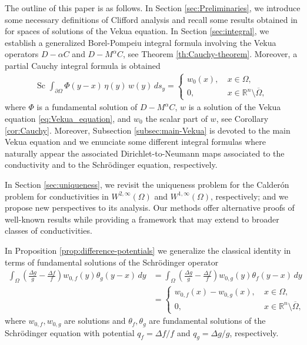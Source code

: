 \documentclass[12pt]{article}
\def\R{\mathbb{R}}
\begin{document}
The outline of this paper is as follows. In Section \ref{sec:Preliminaries}, we introduce some necessary definitions of Clifford analysis and recall some results obtained in \cite{Delgado2023} for spaces of solutions of the Vekua equation.
In Section \ref{sec:integral}, we establish a generalized Borel-Pompeiu integral formula involving the Vekua operators $D-\alpha C$ and $D-M^{\alpha}C$, see Theorem \ref{th:Cauchy-theorem}. Moreover, a partial Cauchy integral formula is obtained
\begin{align}\label{eq:scalar-Cauchy}
  \text{Sc }\int_{\partial\Omega} \Phi(y-x)\, \eta(y) \, w(y) \,ds_{y}=\left\{
   \begin{array}{ll}
      w_0(x), \ & x\in \Omega,\\
      0,           & x\in \R^n\setminus \overline{\Omega},
   \end{array}
\right.
\end{align}
where $\Phi$ is a fundamental solution of $D-M^{\alpha}C$, $w$ is a solution of the Vekua equation \eqref{eq:Vekua_equation}, and $w_0$ the scalar part of $w$, see Corollary \ref{cor:Cauchy}. Moreover, Subsection \ref{subsec:main-Vekua} is devoted to the main Vekua equation and we enunciate some different integral formulas where naturally appear the associated Dirichlet-to-Neumann maps associated to the conductivity and to the Schr\"{o}dinger equation, respectively.


In Section \ref{sec:uniqueness}, we revisit the uniqueness problem for the Calderón problem for conductivities in $W^{2,\infty}(\Omega)$ and $W^{1,\infty}(\Omega)$, respectively; and we propose new perspectives to its analysis. Our methods offer alternative proofs of well-known results while providing a framework that may extend to broader classes of conductivities. 

In Proposition \ref{prop:difference-potentials} we generalize the classical identity in terms of fundamental solutions of the Schr\"{o}dinger operator
\begin{align*}
\int_{\Omega} \left(\frac{\Delta g}{g}-\frac{\Delta f}{f}\right) w_{0,f}(y)\theta_g(y-x)\, dy&=\int_{\Omega} \left(\frac{\Delta g}{g}-\frac{\Delta f}{f}\right) w_{0,g}(y)\theta_f(y-x)\, dy \\
&=\left\{
   \begin{array}{ll}
      w_{0,f}(x)-w_{0,g}(x), \ & x\in \Omega,\\
      0,           & x\in \R^n\setminus \overline{\Omega},
   \end{array}
\right.
\end{align*}
where $w_{0,f}, w_{0,g}$ are solutions and $\theta_f, \theta_g$ are fundamental solutions of the Schr\"{o}dinger equation with potential $q_f=\Delta f/f$ and $q_g=\Delta g/g$, respectively.
\end{document}
